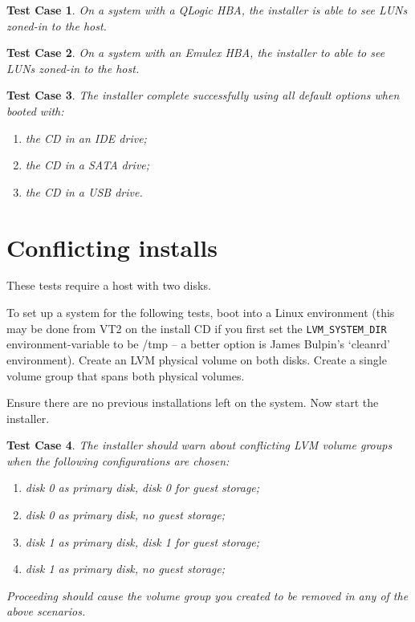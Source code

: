 \documentclass[a4paper]{article}
\newtheorem{testcase}{Test Case}
\begin{document}
\begin{testcase}
On a system with a QLogic HBA, the installer is able to see LUNs
zoned-in to the host.
\end{testcase}

\begin{testcase}
On a system with an Emulex HBA, the installer to able to see LUNs
zoned-in to the host.
\end{testcase}

\begin{testcase}
The installer complete successfully using all default options when
booted with:
\begin{enumerate}
\item the CD in an IDE drive;
\item the CD in a SATA drive;
\item the CD in a USB drive.
\end{enumerate}
\end{testcase}


\section{Conflicting installs}

These tests require a host with two disks.

To set up a system for the following tests, boot into a Linux
environment (this may be done from VT2 on the install CD if you first
set the \texttt{LVM\_SYSTEM\_DIR} environment-variable to be /tmp -- a better
option is James Bulpin's `cleanrd' environment).  Create an LVM
physical volume on both disks. Create a single volume group that spans
both physical volumes.

Ensure there are no previous installations left on the system.  Now
start the installer.

\begin{testcase}
The installer should warn about conflicting LVM volume groups when the
following configurations are chosen:
\begin{enumerate}
\item disk 0 as primary disk, disk 0 for guest storage;
\item disk 0 as primary disk, no guest storage;
\item disk 1 as primary disk, disk 1 for guest storage;
\item disk 1 as primary disk, no guest storage;
\end{enumerate}

Proceeding should cause the volume group you created to be removed in
any of the above scenarios.
\end{testcase}
\end{document}
